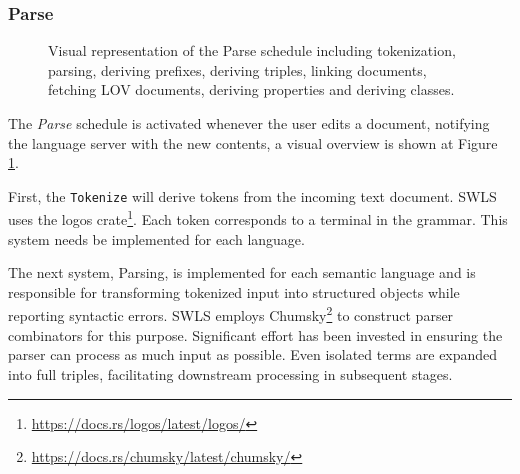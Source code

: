 \subsubsection{Parse}

\begin{figure}[tb]
 \centering
  \caption{Visual representation of the Parse schedule including tokenization, parsing, deriving prefixes, deriving triples, linking documents, fetching LOV documents, deriving properties and deriving classes. }\label{fig:Parse}
\end{figure}

The \textit{Parse} schedule is activated whenever the user edits a document, notifying the language server with the new contents, a visual overview is shown at Figure \ref{fig:Parse}.

First, the \texttt{Tokenize} will derive tokens from the incoming text document. SWLS uses the logos crate\footnote{\url{https://docs.rs/logos/latest/logos/}}. Each token corresponds to a terminal in the grammar. This system needs be implemented for each language.

The next system, Parsing, is implemented for each semantic language and is responsible for transforming tokenized input into structured objects while reporting syntactic errors. 
SWLS employs Chumsky\footnote{\url{https://docs.rs/chumsky/latest/chumsky/}} to construct parser combinators for this purpose.
Significant effort has been invested in ensuring the parser can process as much input as possible.
Even isolated terms are expanded into full triples, facilitating downstream processing in subsequent stages.

